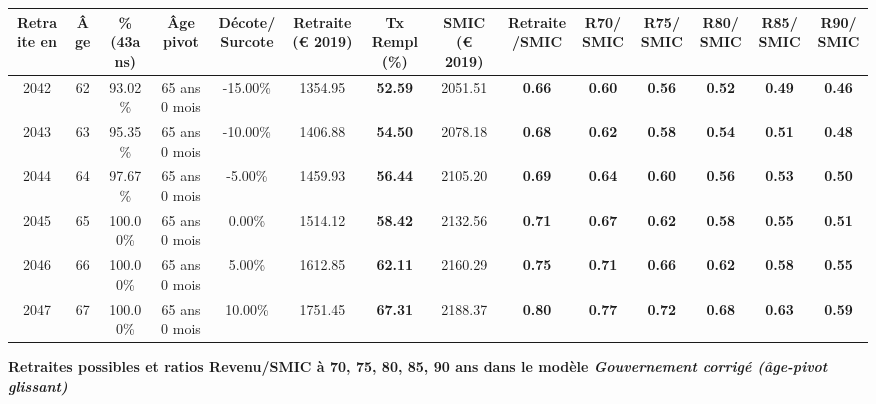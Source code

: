 \begin{adjustbox}{max width=\textwidth} 
\begin{tabular}[htb]{|c|c||c|c|c||c|c||c|c||c|c|c|c|c|} 
\hline 
 Retraite en &  Âge &  \%(43ans) &  Âge pivot &  Décote/Surcote &  Retraite (\euro{} 2019) &  Tx Rempl(\%) &  SMIC (\euro{} 2019) &  Retraite/SMIC &  R70/SMIC &  R75/SMIC &  R80/SMIC &  R85/SMIC &  R90/SMIC \\ 
\hline \hline 
 2042 &  62 &  93.02\% &  65 ans 0 mois &  -15.00\% &  1354.95 &  {\bf 52.59} &  2051.51 &  {\bf {\color{red} 0.66}} &  {\bf {\color{red} 0.60}} &  {\bf {\color{red} 0.56}} &  {\bf {\color{red} 0.52}} &  {\bf {\color{red} 0.49}} &  {\bf {\color{red} 0.46}} \\ 
\hline 
 2043 &  63 &  95.35\% &  65 ans 0 mois &  -10.00\% &  1406.88 &  {\bf 54.50} &  2078.18 &  {\bf {\color{red} 0.68}} &  {\bf {\color{red} 0.62}} &  {\bf {\color{red} 0.58}} &  {\bf {\color{red} 0.54}} &  {\bf {\color{red} 0.51}} &  {\bf {\color{red} 0.48}} \\ 
\hline 
 2044 &  64 &  97.67\% &  65 ans 0 mois &  -5.00\% &  1459.93 &  {\bf 56.44} &  2105.20 &  {\bf {\color{red} 0.69}} &  {\bf {\color{red} 0.64}} &  {\bf {\color{red} 0.60}} &  {\bf {\color{red} 0.56}} &  {\bf {\color{red} 0.53}} &  {\bf {\color{red} 0.50}} \\ 
\hline 
 2045 &  65 &  100.00\% &  65 ans 0 mois &  0.00\% &  1514.12 &  {\bf 58.42} &  2132.56 &  {\bf {\color{red} 0.71}} &  {\bf {\color{red} 0.67}} &  {\bf {\color{red} 0.62}} &  {\bf {\color{red} 0.58}} &  {\bf {\color{red} 0.55}} &  {\bf {\color{red} 0.51}} \\ 
\hline 
 2046 &  66 &  100.00\% &  65 ans 0 mois &  5.00\% &  1612.85 &  {\bf 62.11} &  2160.29 &  {\bf {\color{red} 0.75}} &  {\bf {\color{red} 0.71}} &  {\bf {\color{red} 0.66}} &  {\bf {\color{red} 0.62}} &  {\bf {\color{red} 0.58}} &  {\bf {\color{red} 0.55}} \\ 
\hline 
 2047 &  67 &  100.00\% &  65 ans 0 mois &  10.00\% &  1751.45 &  {\bf 67.31} &  2188.37 &  {\bf {\color{red} 0.80}} &  {\bf {\color{red} 0.77}} &  {\bf {\color{red} 0.72}} &  {\bf {\color{red} 0.68}} &  {\bf {\color{red} 0.63}} &  {\bf {\color{red} 0.59}} \\ 
\hline 
\hline 
\end{tabular} 
\end{adjustbox} 
 
 \vspace{0.1cm} 
{\bf \noindent Retraites possibles et ratios Revenu/SMIC à 70, 75, 80, 85, 90 ans dans le modèle \emph{Gouvernement corrigé (âge-pivot glissant)}}  
 
